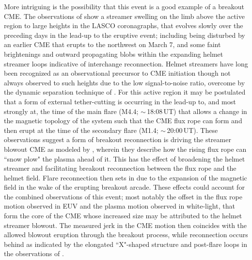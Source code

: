 \documentclass[namedreferences]{solarphysics}
\begin{document}
\begin{article}

More intriguing is the possibility that this event is a good example of a breakout CME. The observations of  show a streamer swelling on the limb above the active region to large heights in the LASCO coronagraphs, that evolves slowly over the preceding days in the lead-up to the eruptive event; including being disturbed by an earlier CME that erupts to the northwest on March 7, and some faint brightenings and outward propagating blobs within the expanding helmet streamer loops indicative of interchange reconnection. Helmet streamers have long been recognized as an observational precursor to CME initiation \cite{1993JGR....9813177H} though not always observed to such heights due to the low signal-to-noise ratio, overcome by the dynamic separation technique of . For this active region it may be postulated that a form of external tether-cutting is occurring in the lead-up to, and most strongly at, the time of the main flare (M4.4; $\sim$\,18:08\,UT) that allows a change in the magnetic topology of the system such that the CME flux rope can form and then erupt at the time of the secondary flare (M1.4; $\sim$\,20:00\,UT). These observations suggest a form of breakout reconnection is driving the streamer blowout CME as modeled by , wherein they describe how the rising flux rope can ``snow plow" the plasma ahead of it. This has the effect of broadening the helmet streamer and facilitating breakout reconnection between the flux rope and the helmet field. Flare reconnection then sets in due to the expansion of the magnetic field in the wake of the erupting breakout arcade. These effects could account for the combined observations of this event; most notably the offset in the flux rope motion observed in EUV and the plasma motion observed in white-light, that form the core of the CME whose increased size may be attributed to the helmet streamer blowout. The measured jerk in the CME motion then coincides with the allowed blowout eruption through the breakout process, while reconnection occurs behind as indicated by the elongated ``X"-shaped structure and post-flare loops in the observations of .


\end{article}
\end{document}
